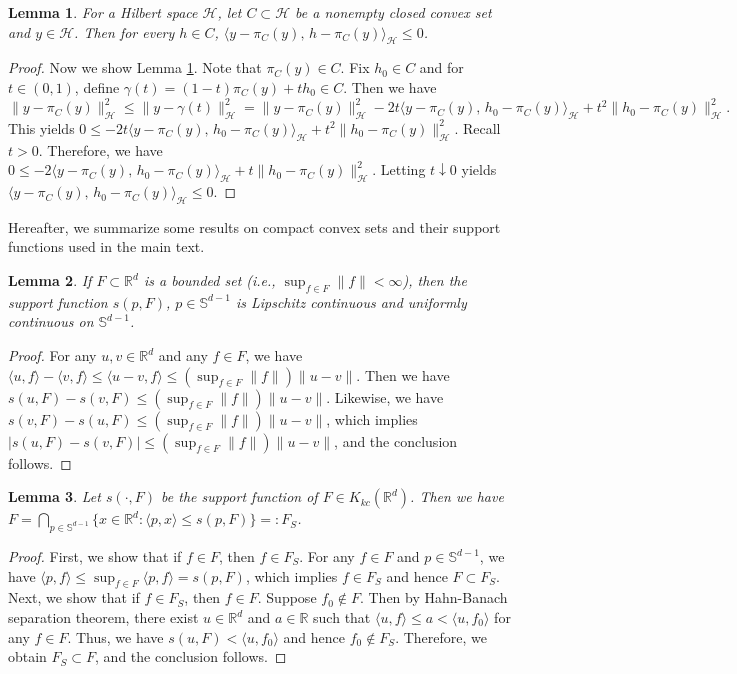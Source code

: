 \documentclass[11pt,reqno]{amsart}
\newtheorem{lemma}{Lemma}
\begin{document}
\begin{lemma}\label{lem:inn-prod}
For a Hilbert space $\mathcal{H}$, let $C\subset\mathcal{H}$ be a nonempty closed convex set and $y \in \mathcal{H}$. Then for every $h\in C$, $\langle y-\pi_C(y),\, h-\pi_C(y)\rangle_\mathcal{H} \leq 0$.
\end{lemma}
\begin{proof}
Now we show Lemma \ref{lem:inn-prod}. Note that $\pi_C(y) \in C$. Fix $h_0 \in C$ and for $t\in (0,1)$, define $\gamma(t)=(1-t)\pi_C(y) + t h_0\in C$. Then we have
\[
\|y-\pi_C(y)\|_\mathcal{H}^2 \leq \|y-\gamma(t)\|_\mathcal{H}^2 = \|y-\pi_C(y)\|_\mathcal{H}^2 - 2t\langle y-\pi_C(y),\, h_0 -\pi_C(y)\rangle_\mathcal{H} + t^2\|h_0-\pi_C(y)\|_\mathcal{H}^2.
\]
This yields $0 \leq - 2t\langle y-\pi_C(y),\, h_0 -\pi_C(y)\rangle_\mathcal{H} + t^2\|h_0-\pi_C(y)\|_\mathcal{H}^2$. Recall $t >0$. Therefore, we have $0 \le -2\langle y-\pi_C(y),\, h_0-\pi_C(y)\rangle_\mathcal{H} + t\|h_0-\pi_C(y)\|_\mathcal{H}^2$. Letting $t\downarrow0$ yields $\langle y-\pi_C(y),\, h_0-\pi_C(y)\rangle_\mathcal{H} \leq 0$.
\end{proof}

Hereafter, we summarize some results on compact convex sets and their support functions used in the main text.

\begin{lemma}\label{lem:sf-conti}
If $F \subset \mathbb{R}^d$ is a  bounded set (i.e., $\sup_{f \in F}\|f\|<\infty$), then the support function $s(p, F)$, $p \in \mathbb{S}^{d-1}$ is Lipschitz continuous and uniformly continuous on $\mathbb{S}^{d-1}$. 
\end{lemma}
\begin{proof}
For any $u,v \in \mathbb{R}^d$ and any $f \in F$, we have $\langle u, f \rangle - \langle v, f \rangle \leq \langle u-v, f \rangle  \leq (\sup_{f \in F}\|f\|)\|u - v\|$. Then we have $s(u,F) - s(v,F)  \leq (\sup_{f \in F}\|f\|)\|u - v\|$. Likewise, we have $s(v,F) - s(u,F) \leq (\sup_{f \in F}\|f\|)\|u - v\|$, which implies $|s(u,F) - s(v,F)| \leq (\sup_{f \in F}\|f\|)\|u - v\|$, and the conclusion follows.
\end{proof}

\begin{lemma}\label{lem:cc-set-rep}
Let $s(\cdot, F)$ be the support function of $F\in K_{kc}(\mathbb{R}^d)$. Then we have $F = \bigcap_{p \in \mathbb{S}^{d-1}}\{x \in \mathbb{R}^d: \langle p, x \rangle \leq s(p, F)\}=: F_S$. 
\end{lemma}
\begin{proof}
First, we show that if $f \in F$, then $f \in  F_S$. For any $f \in F$ and $p \in \mathbb{S}^{d-1}$, we have $\langle p, f \rangle \leq \sup_{f \in F}\langle p, f\rangle = s(p,F)$, which implies $f \in F_S$ and hence $F \subset F_S$. Next, we show that if $f \in F_S$, then $f \in F$. Suppose $f_0 \notin F$. Then by Hahn-Banach separation theorem, there exist $u \in \mathbb{R}^d$ and $a \in \mathbb{R}$ such that $\langle u, f\rangle \leq a < \langle u, f_0 \rangle$ for any $f \in F$. Thus, we have $s(u,F) < \langle u, f_0 \rangle$ and hence $f_0 \notin F_S$. Therefore, we obtain $F_S \subset F$, and the conclusion follows.  
\end{proof}
\end{document}
